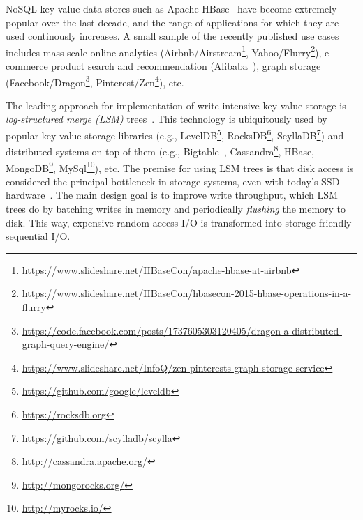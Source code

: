 
NoSQL key-value data stores such as Apache HBase~\cite{hbase} have become extremely popular over the last decade, 
and the range of applications for which they are used continously increases. A small sample of the recently 
published use cases includes mass-scale online analytics (Airbnb/Airstream\footnote{\small{\url{https://www.slideshare.net/HBaseCon/apache-hbase-at-airbnb}}}, 
Yahoo/Flurry\footnote{\small{\url{https://www.slideshare.net/HBaseCon/hbasecon-2015-hbase-operations-in-a-flurry}}}), e-commerce product search 
and recommendation (Alibaba~\cite{alibabahbase}), 
graph storage (Facebook/Dragon\footnote{\small{\url{https://code.facebook.com/posts/1737605303120405/dragon-a-distributed-graph-query-engine/}}}, 
Pinterest/Zen\footnote{\small{\url{https://www.slideshare.net/InfoQ/zen-pinterests-graph-storage-service}}}), etc. 


The leading approach for implementation of write-intensive key-value storage is \emph{log-structured merge (LSM)} trees~\cite{O'Neil:1996}.
This technology is ubiquitously used by popular key-value storage libraries (e.g., LevelDB\footnote{\small{\url{https://github.com/google/leveldb}}}, 
RocksDB\footnote{\small{\url{https://rocksdb.org}}}, ScyllaDB\footnote{\small{\url{https://github.com/scylladb/scylla}}}) and distributed systems on top 
of them (e.g., Bigtable~\cite{Chang2008}, Cassandra\footnote{\small{\url{http://cassandra.apache.org/}}}, HBase, 
MongoDB\footnote{\small{\url{http://mongorocks.org/}}}, MySql\footnote{\small{\url{http://myrocks.io/}}}), etc. 
The premise for using LSM trees is that disk access is considered the principal bottleneck in storage systems, even with today's SSD hardware~\cite{rocksdb,Tanenbaum:2014:MOS:2655363,Wu:2012:AWB:2093139.2093140}. 
The main design goal is to improve write throughput, which LSM trees do by batching writes in memory 
and periodically \emph{flushing} the memory  to disk. This way, expensive random-access I/O is transformed 
into storage-friendly sequential I/O. 

